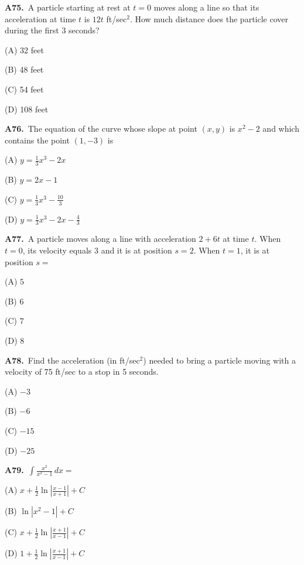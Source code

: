 \documentclass[11pt]{article}
\begin{document}
\bigskip\noindent\textbf{A75.}\ A particle starting at rest at $t=0$ moves along a line so that its acceleration at time $t$ is $12t$ ft/sec$^2$. How much distance does the particle cover during the first 3 seconds?
\begin{list}{}{\setlength{\leftmargin}{3em}\setlength{\labelwidth}{2.5em}\setlength{\itemsep}{0pt}\setlength{\topsep}{2pt}}
\item[(A)] 32 feet
\item[(B)] 48 feet
\item[(C)] 54 feet
\item[(D)] 108 feet
\end{list}

\bigskip\noindent\textbf{A76.}\ The equation of the curve whose slope at point $(x,y)$ is $x^2-2$ and which contains the point $(1,-3)$ is
\begin{list}{}{\setlength{\leftmargin}{3em}\setlength{\labelwidth}{2.5em}\setlength{\itemsep}{0pt}\setlength{\topsep}{2pt}}
\item[(A)] $y=\frac13x^3-2x$
\item[(B)] $y=2x-1$
\item[(C)] $y=\frac13x^3-\frac{10}3$
\item[(D)] $y=\frac13x^3-2x-\frac43$
\end{list}

\bigskip\noindent\textbf{A77.}\ A particle moves along a line with acceleration $2+6t$ at time $t$. When $t=0$, its velocity equals $3$ and it is at position $s=2$. When $t=1$, it is at position $s=$
\begin{list}{}{\setlength{\leftmargin}{3em}\setlength{\labelwidth}{2.5em}\setlength{\itemsep}{0pt}\setlength{\topsep}{2pt}}
\item[(A)] $5$
\item[(B)] $6$
\item[(C)] $7$
\item[(D)] $8$
\end{list}

\bigskip\noindent\textbf{A78.}\ Find the acceleration (in ft/sec$^2$) needed to bring a particle moving with a velocity of 75 ft/sec to a stop in 5 seconds.
\begin{list}{}{\setlength{\leftmargin}{3em}\setlength{\labelwidth}{2.5em}\setlength{\itemsep}{0pt}\setlength{\topsep}{2pt}}
\item[(A)] $-3$
\item[(B)] $-6$
\item[(C)] $-15$
\item[(D)] $-25$
\end{list}

\bigskip\noindent\textbf{A79.}\ $\displaystyle\int\frac{x^2}{x^2-1}\,dx=$
\begin{list}{}{\setlength{\leftmargin}{3em}\setlength{\labelwidth}{2.5em}\setlength{\itemsep}{0pt}\setlength{\topsep}{2pt}}
\item[(A)] $x+\frac12\ln\left|\frac{x-1}{x+1}\right|+C$
\item[(B)] $\ln|x^2-1|+C$
\item[(C)] $x+\frac12\ln\left|\frac{x+1}{x-1}\right|+C$
\item[(D)] $1+\frac12\ln\left|\frac{x+1}{x-1}\right|+C$
\end{list}
\end{document}
